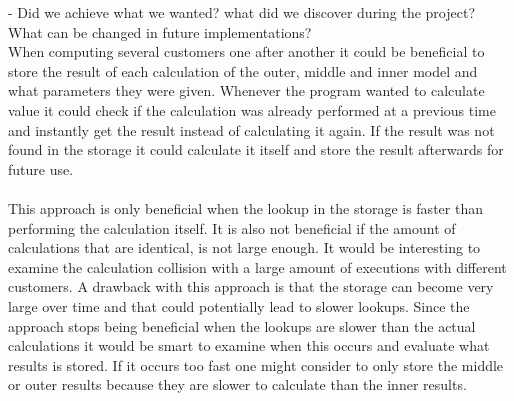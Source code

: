 - Did we achieve what we wanted? what did we discover during the project? What can be changed in future implementations? \\

When computing several customers one after another it could be beneficial to store the result of each calculation of the outer, middle and inner model and what parameters they were given. Whenever the program wanted to calculate value it could check if the calculation was already performed at a previous time and instantly get the result instead of calculating it again. If the result was not found in the storage it could calculate it itself and store the result afterwards for future use. \\ \\
This approach is only beneficial when the lookup in the storage is faster than performing the calculation itself. It is also not beneficial if the amount of calculations that are identical, is not large enough. It would be interesting to examine the calculation collision with a large amount of executions with different customers. A drawback with this approach is that the storage can become very large over time and that could potentially lead to slower lookups. Since the approach stops being beneficial when the lookups are slower than the actual calculations it would be smart to examine when this occurs and evaluate what results is stored. If it occurs too fast one might consider to only store the middle or outer results because they are slower to calculate than the inner results.
